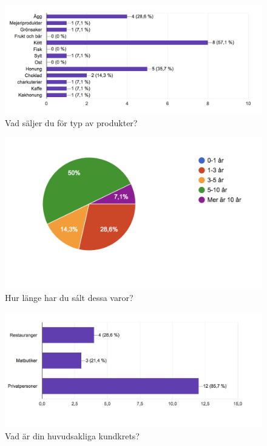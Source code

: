 \documentclass[10pt,a4paper,oneside]{article}
\begin{document}


\newpage

\begin{figure}
	\includegraphics[scale=0.6]{1.png}
	\caption{Vad s\"aljer du f\"or typ av produkter?}
\end{figure}

\begin{figure}
	\includegraphics[scale=0.6]{2.png}
	\caption{Hur l\"ange har du s\'alt dessa varor?}
\end{figure}

\begin{figure}
	\includegraphics[scale=0.6]{3.png}
	\caption{Vad \"ar din huvudsakliga kundkrets?}
\end{figure}
\end{document}
